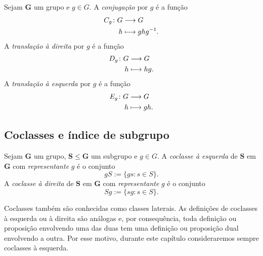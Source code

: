 \begin{definition}
Sejam $\bm G$ um grupo e $g \in G$. A \emph{conjugação} por $g$ é a função
	\begin{align*}
	{C_g}\colon {G} &\longrightarrow {G} \\{h} &\longmapsto ghg^{-1}.
	\end{align*}
A \emph{translação à direita} por $g$ é a função
	\begin{align*}
	{D_g}\colon {G} &\longrightarrow {G} \\{h} &\longmapsto hg.
	\end{align*}
A \emph{translação à esquerda} por $g$ é a função
	\begin{align*}
	{E_g}\colon {G} &\longrightarrow {G} \\{h} &\longmapsto gh.
	\end{align*}
\end{definition}

\subsection{Coclasses e índice de subgrupo}

\begin{definition}
Sejam $\bm G$ um grupo, $\bm S \leq \bm G$ um subgrupo e $g \in G$. A \emph{coclasse à esquerda} de $\bm S$ em $\bm G$ com \emph{representante} $g$ é o conjunto
	\begin{equation*}
	gS := \{gs:s \in S\}.
	\end{equation*}
A \emph{coclasse à direita} de $\bm S$ em $\bm G$ com \emph{representante} $g$ é o conjunto
	\begin{equation*}
	Sg := \{sg:s \in S\}.
	\end{equation*}
\end{definition}

Coclasses também são conhecidas como classes laterais. As definições de coclasses à esquerda ou à direita são análogas e, por consequência, toda definição ou proposição envolvendo uma das duas tem uma definição ou proposição dual envolvendo a outra. Por esse motivo, durante este capítulo consideraremos sempre coclasses à esquerda.

